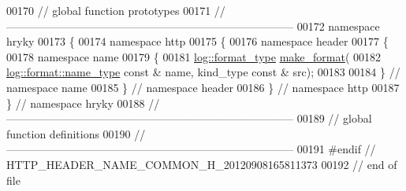 \begin{DoxyCode}
00170 \textcolor{comment}{// global function prototypes}
00171 \textcolor{comment}{//
      ------------------------------------------------------------------------------}
00172 \textcolor{keyword}{namespace }hryky
00173 \{
00174 \textcolor{keyword}{namespace }http
00175 \{
00176 \textcolor{keyword}{namespace }header
00177 \{
00178 \textcolor{keyword}{namespace }name
00179 \{
00181     \hyperlink{namespacehryky_1_1log_ad50448c3f934f1eacd5c1bcffe8111e1}{log::format_type} \hyperlink{namespacehryky_afd615217f648ff164bc40fb82166d959}{make_format}(
00182         \hyperlink{namespacehryky_1_1log_1_1format_ab7408d1e2ed2d648dbf9bba69eb74288}{log::format::name_type} \textcolor{keyword}{const} & name, kind\_type \textcolor{keyword}{const} & src);
00183 
00184 \} \textcolor{comment}{// namespace name}
00185 \} \textcolor{comment}{// namespace header}
00186 \} \textcolor{comment}{// namespace http}
00187 \} \textcolor{comment}{// namespace hryky}
00188 \textcolor{comment}{//
      ------------------------------------------------------------------------------}
00189 \textcolor{comment}{// global function definitions}
00190 \textcolor{comment}{//
      ------------------------------------------------------------------------------}
00191 \textcolor{preprocessor}{#endif // HTTP\_HEADER\_NAME\_COMMON\_H\_20120908165811373}
00192 \textcolor{preprocessor}{}\textcolor{comment}{// end of file}
\end{DoxyCode}
